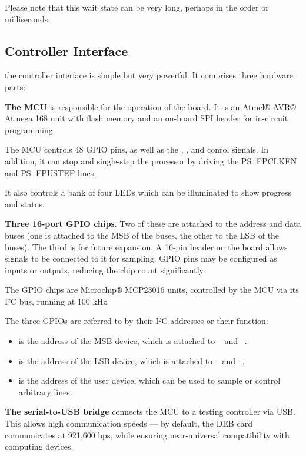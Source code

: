 Please note that this wait state can be very long, perhaps in the order
or milliseconds.

\subsection{Controller Interface}

the controller interface is simple but very powerful. It comprises
three hardware parts:

\begin{description}
\item{\bfseries The \gls{MCU}} is responsible for the operation of the
  board. It is an Atmel® AVR® Atmega 168 unit with flash memory and an
  on-board SPI header for in-circuit programming.

  The \gls{MCU} controls 48 \gls{GPIO} pins, as well as the ,
  ,  and  conrol signals. In addition, it can stop
  and single-step the processor by driving the \ps{FPCLKEN} and
  \ps{FPUSTEP} lines.

  It also controls a bank of four LEDs which can be
    illuminated to show progress and status.

\item{\bfseries Three 16-port \gls{GPIO} chips}. Two of these are attached
  to the address and data buses (one is attached to the MSB of the
  buses, the other to the LSB of the buses). The third is for future
  expansion. A 16-pin header on the board allows signals to be
  connected to it for sampling. GPIO pins may be configured as inputs
  or outputs, reducing the chip count significantly.

  The \gls{GPIO} chips are Microchip® MCP23016 units, controlled by the
  \gls{MCU} via its I²C bus, running at 100 kHz.

  The three GPIOs are referred to by their I²C addresses or their function:
  
  \begin{itemize}
  \item {} is the address of the \gls{MSB} device, which is
    attached to – and –.
  \item {} is the address of the \gls{LSB} device, which is
    attached to – and –.
  \item {} is the address of the user device, which can be used to
    sample or control arbitrary lines.
  \end{itemize}

\item{\bfseries The serial-to-USB bridge} connects the \gls{MCU} to a
  testing controller via \gls{USB}. This allows high communication
  speeds — by default, the DEB card communicates at 921,600 bps, while
  ensuring near-universal compatibility with computing devices.
\end{description}

